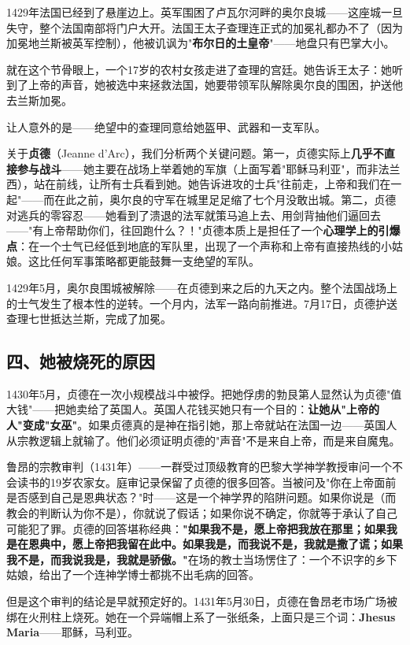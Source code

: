 \documentclass[a4paper,12pt]{ctexart}
\begin{document}
1429年法国已经到了悬崖边上。英军围困了卢瓦尔河畔的奥尔良城——这座城一旦失守，整个法国南部将门户大开。法国王太子查理连正式的加冕礼都办不了（因为加冕地兰斯被英军控制），他被讥讽为"\textbf{布尔日的土皇帝}"——地盘只有巴掌大小。

就在这个节骨眼上，一个17岁的农村女孩走进了查理的宫廷。她告诉王太子：她听到了上帝的声音，她被选中来拯救法国，她要带领军队解除奥尔良的围困，护送他去兰斯加冕。

让人意外的是——绝望中的查理同意给她盔甲、武器和一支军队。

关于\textbf{贞德}（Jeanne d'Arc），我们分析两个关键问题。第一，贞德实际上\textbf{几乎不直接参与战斗}——她主要在战场上举着她的军旗（上面写着"耶稣马利亚"，而非法兰西），站在前线，让所有士兵看到她。她告诉进攻的士兵"往前走，上帝和我们在一起"——而在此之前，奥尔良的守军在城里足足缩了七个月没敢出城。第二，贞德对逃兵的零容忍——她看到了溃退的法军就策马追上去、用剑背抽他们逼回去——"有上帝帮助你们，往回跑什么？！"贞德本质上是担任了一个\textbf{心理学上的引爆点}：在一个士气已经低到地底的军队里，出现了一个声称和上帝有直接热线的小姑娘。这比任何军事策略都更能鼓舞一支绝望的军队。

1429年5月，奥尔良围城被解除——在贞德到来之后的九天之内。整个法国战场上的士气发生了根本性的逆转。一个月内，法军一路向前推进。7月17日，贞德护送查理七世抵达兰斯，完成了加冕。

\subsection*{四、她被烧死的原因}

1430年5月，贞德在一次小规模战斗中被俘。把她俘虏的勃艮第人显然认为贞德"值大钱"——把她卖给了英国人。英国人花钱买她只有一个目的：\textbf{让她从"上帝的人"变成"女巫"}。如果贞德真的是神在指引她，那上帝就站在法国一边——英国人从宗教逻辑上就输了。他们必须证明贞德的"声音"不是来自上帝，而是来自魔鬼。

鲁昂的宗教审判（1431年）——一群受过顶级教育的巴黎大学神学教授审问一个不会读书的19岁农家女。庭审记录保留了贞德的很多回答。当被问及"你在上帝面前是否感到自己是恩典状态？"时——这是一个神学界的陷阱问题。如果你说是（而教会的判断认为你不是），你就说了假话；如果你说不确定，你就等于承认了自己可能犯了罪。贞德的回答堪称经典：\textbf{"如果我不是，愿上帝把我放在那里；如果我是在恩典中，愿上帝把我留在此中。如果我是，而我说不是，我就是撒了谎；如果我不是，而我说我是，我就是骄傲。"}在场的教士当场愣住了：一个不识字的乡下姑娘，给出了一个连神学博士都挑不出毛病的回答。

但是这个审判的结论是早就预定好的。1431年5月30日，贞德在鲁昂老市场广场被绑在火刑柱上烧死。她在一个异端帽上系了一张纸条，上面只是三个词：\textbf{Jhesus Maria}——耶稣，马利亚。
\end{document}
